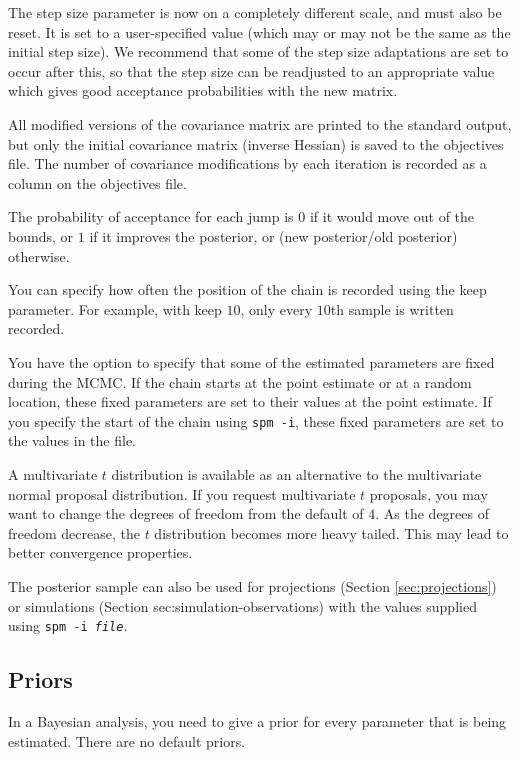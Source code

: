 The step size parameter is now on a completely different scale, and must also be reset. It is set to a user-specified value (which may or may not be the same as the initial step size). We recommend that some of the step size adaptations are set to occur after this, so that the step size can be readjusted to an appropriate value which gives good acceptance probabilities with the new matrix. 

All modified versions of the covariance matrix are printed to the standard output, but only the initial covariance matrix (inverse Hessian) is saved to the objectives file. The number of covariance modifications by each iteration is recorded as a column on the objectives file. 

The probability of acceptance for each jump is $0$ if it would move out of the bounds, or $1$ if it improves the posterior, or (new posterior/old posterior) otherwise. 

You can specify how often the position of the chain is recorded using the keep parameter. For example, with keep $10$, only every $10$th sample is written recorded. 

You have the option to specify that some of the estimated parameters are fixed during the MCMC. If the chain starts at the point estimate or at a random location, these fixed parameters are set to their values at the point estimate. If you specify the start of the chain using \texttt{spm -i}, these fixed parameters are set to the values in the file.

A multivariate $t$ distribution is available as an alternative to the multivariate normal proposal distribution. If you request multivariate $t$ proposals, you may want to change the degrees of freedom from the default of $4$. As the degrees of freedom decrease, the $t$ distribution becomes more heavy tailed. This may lead to better convergence properties.

The posterior sample can also be used for projections (Section \ref{sec:projections}) or simulations (Section {sec:simulation-observations}) with the values supplied using \texttt{spm -i \emph{file}}.

\subsection{Priors\label{sec:priors}}

In a Bayesian analysis, you need to give a prior for every parameter that is being estimated. There are no default priors.  

